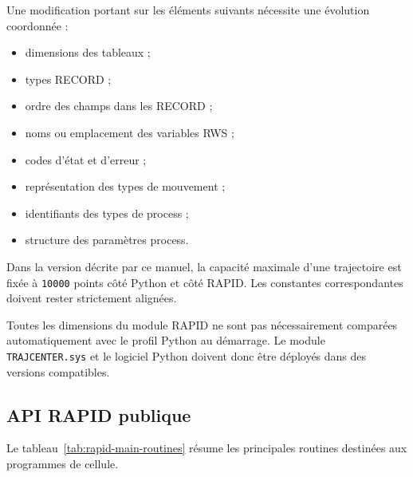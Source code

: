 \documentclass{rapportENSAM}
\begin{document}
Une modification portant sur les éléments suivants nécessite une évolution
coordonnée :

\begin{itemize}
    \item dimensions des tableaux ;
    \item types RECORD ;
    \item ordre des champs dans les RECORD ;
    \item noms ou emplacement des variables RWS ;
    \item codes d'état et d'erreur ;
    \item représentation des types de mouvement ;
    \item identifiants des types de process ;
    \item structure des paramètres process.
\end{itemize}

Dans la version décrite par ce manuel, la capacité maximale d'une trajectoire
est fixée à \texttt{10000} points côté Python et côté RAPID. Les constantes
correspondantes doivent rester strictement alignées.

Toutes les dimensions du module RAPID ne sont pas nécessairement comparées
automatiquement avec le profil Python au démarrage. Le module
\texttt{TRAJCENTER.sys} et le logiciel Python doivent donc être déployés dans
des versions compatibles.


\subsection{API RAPID publique}
\label{subsec:rapid-public-api}

Le tableau~\ref{tab:rapid-main-routines} résume les principales routines
destinées aux programmes de cellule.
\end{document}

